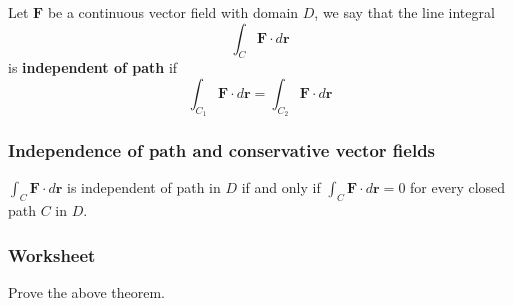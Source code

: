 \documentclass[aspectratio=169]{beamer}
\begin{document}
\begin{frame}
\begin{definition}
Let \(\mathbf{F}\) be a continuous vector field with domain \(D\), we say that the
line integral
\begin{equation*}
    \int_C \mathbf{F} \cdot d\mathbf{r} 
\end{equation*}
is \textbf{independent of path} if
\begin{equation*}
    \int_{C_1} \mathbf{F}\cdot d\mathbf{r} 
    =
    \int_{C_2} \mathbf{F} \cdot d\mathbf{r} 
\end{equation*}
\end{definition}
\end{frame}


\begin{frame}
    \frametitle{Independence of path and conservative vector fields}
    \begin{theorem}
    \(\int_C \mathbf{F}\cdot d\mathbf{r}\) is independent of path in \(D\) if and only if
    \(\int_C \mathbf{F} \cdot d\mathbf{r} = 0\) for every closed path \(C\) in \(D\).
    \end{theorem}
\end{frame}

\begin{frame}
    \frametitle{Worksheet}
    Prove the above theorem.
\end{frame}
\end{document}
